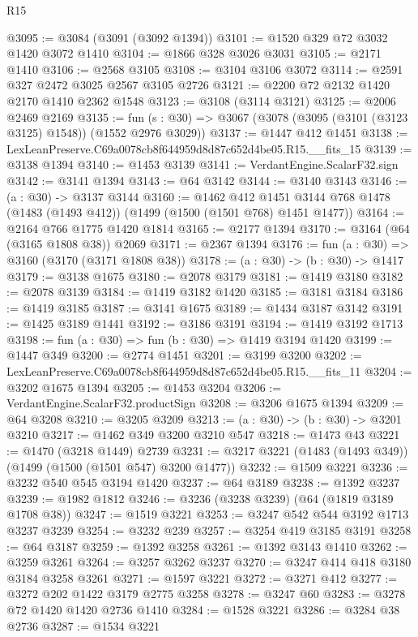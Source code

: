 \begin{lexlean}{R15}
\begin{coremodule}
@3095 := @3084 (@3091 (@3092 @1394))
@3101 := @1520 @329 @72 @3032 @1420 @3072 @1410
@3104 := @1866 @328 @3026 @3031
@3105 := @2171 @1410
@3106 := @2568 @3105
@3108 := @3104 @3106 @3072
@3114 := @2591 @327 @2472 @3025 @2567 @3105 @2726
@3121 := @2200 @72 @2132 @1420 @2170 @1410 @2362 @1548
@3123 := @3108 (@3114 @3121)
@3125 := @2006 @2469 @2169
@3135 := fun (s : @30) => @3067 (@3078 (@3095 (@3101 (@3123 @3125) @1548)) (@1552 @2976 @3029))
@3137 := @1447 @412 @1451
@3138 := LexLeanPreserve.C69a0078cb8f644959d8d87c652d4be05.R15.__fits_15
@3139 := @3138 @1394
@3140 := @1453 @3139
@3141 := VerdantEngine.ScalarF32.sign
@3142 := @3141 @1394
@3143 := @64 @3142
@3144 := @3140 @3143
@3146 := (a : @30) -> @3137 @3144
@3160 := @1462
    @412
    @1451
    @3144
    @768
    @1478
    (@1483 (@1493 @412))
    (@1499 (@1500 (@1501 @768) @1451 @1477))
@3164 := @2164 @766 @1775 @1420 @1814
@3165 := @2177 @1394
@3170 := @3164 (@64 (@3165 @1808 @38)) @2069
@3171 := @2367 @1394
@3176 := fun (a : @30) => @3160 (@3170 (@3171 @1808 @38))
@3178 := (a : @30) -> (b : @30) -> @1417
@3179 := @3138 @1675
@3180 := @2078 @3179
@3181 := @1419 @3180
@3182 := @2078 @3139
@3184 := @1419 @3182 @1420
@3185 := @3181 @3184
@3186 := @1419 @3185
@3187 := @3141 @1675
@3189 := @1434 @3187 @3142
@3191 := @1425 @3189 @1441
@3192 := @3186 @3191
@3194 := @1419 @3192 @1713
@3198 := fun (a : @30) => fun (b : @30) => @1419 @3194 @1420
@3199 := @1447 @349
@3200 := @2774 @1451
@3201 := @3199 @3200
@3202 := LexLeanPreserve.C69a0078cb8f644959d8d87c652d4be05.R15.__fits_11
@3204 := @3202 @1675 @1394
@3205 := @1453 @3204
@3206 := VerdantEngine.ScalarF32.productSign
@3208 := @3206 @1675 @1394
@3209 := @64 @3208
@3210 := @3205 @3209
@3213 := (a : @30) -> (b : @30) -> @3201 @3210
@3217 := @1462 @349 @3200 @3210 @547
@3218 := @1473 @43
@3221 := @1470 (@3218 @1449) @2739
@3231 := @3217 @3221 (@1483 (@1493 @349)) (@1499 (@1500 (@1501 @547) @3200 @1477))
@3232 := @1509 @3221
@3236 := @3232 @540 @545 @3194 @1420
@3237 := @64 @3189
@3238 := @1392 @3237
@3239 := @1982 @1812
@3246 := @3236 (@3238 @3239) (@64 (@1819 @3189 @1708 @38))
@3247 := @1519 @3221
@3253 := @3247 @542 @544 @3192 @1713 @3237 @3239
@3254 := @3232 @239
@3257 := @3254 @419 @3185 @3191
@3258 := @64 @3187
@3259 := @1392 @3258
@3261 := @1392 @3143 @1410
@3262 := @3259 @3261
@3264 := @3257 @3262 @3237
@3270 := @3247 @414 @418 @3180 @3184 @3258 @3261
@3271 := @1597 @3221
@3272 := @3271 @412
@3277 := @3272 @202 @1422 @3179 @2775 @3258
@3278 := @3247 @60
@3283 := @3278 @72 @1420 @1420 @2736 @1410
@3284 := @1528 @3221
@3286 := @3284 @38 @2736
@3287 := @1534 @3221

\end{coremodule}
\end{lexlean}
